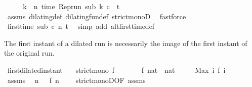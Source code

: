 \begin{isabellebody}
\ \isamarkupfalse%
\ {\isacharasterisk}\ \isamarkupfalse%
\ {\isacartoucheopen}{\isacharparenleft}{\isasymforall}k\ {\isacharless}\ n{\isachardot}\ time\ {\isacharparenleft}{\isacharparenleft}Rep{\isacharunderscore}run\ sub{\isacharparenright}\ k\ c{\isacharparenright}\ {\isacharless}\ t{\isacharparenright}{\isacartoucheclose}\isanewline
\ \ \ \ \isamarkupfalse%
\ assms\ dilating{\isacharunderscore}def\ dilating{\isacharunderscore}fun{\isacharunderscore}def\ strict{\isacharunderscore}monoD\ \isamarkupfalse%
\ fastforce\isanewline
\ \ \isamarkupfalse%
\ \isamarkupfalse%
\ {\isacartoucheopen}first{\isacharunderscore}time\ sub\ c\ n\ t{\isacartoucheclose}\ \isamarkupfalse%
\ {\isacharparenleft}simp\ add{\isacharcolon}\ alt{\isacharunderscore}first{\isacharunderscore}time{\isacharunderscore}def{\isacharparenright}\isanewline
{}\isamarkupfalse%
%
\endisatagproof
{\isafoldproof}%
%
\isadelimproof
%
\endisadelimproof
%
\begin{isamarkuptext}%
The first instant of a dilated run is necessarily the image of the first instant
  of the original run.%
\end{isamarkuptext}\isamarkuptrue%
\isamarkupfalse%
\ first{\isacharunderscore}dilated{\isacharunderscore}instant{\isacharcolon}\isanewline
\ \ \ {\isacartoucheopen}strict{\isacharunderscore}mono\ f{\isacartoucheclose}\isanewline
\ \ \ \ \ \ \ {\isacartoucheopen}f\ {\isacharparenleft}{}{\isacharcolon}{\isacharcolon}nat{\isacharparenright}\ {\isacharequal}\ {\isacharparenleft}{}{\isacharcolon}{\isacharcolon}nat{\isacharparenright}{\isacartoucheclose}\isanewline
\ \ \ \ \ {\isacartoucheopen}Max\ {\isacharbraceleft}i{\isachardot}\ f\ i\ {\isasymle}\ {}{\isacharbraceright}\ {\isacharequal}\ {}{\isacartoucheclose}\isanewline
%
\isadelimproof
%
\endisadelimproof
%
\isatagproof
{}\isamarkupfalse%
\ {\isacharminus}\isanewline
\ \ \isamarkupfalse%
\ assms{\isacharparenleft}{}{\isacharparenright}\ \isamarkupfalse%
\ {\isacartoucheopen}{\isasymforall}n\ {\isachargreater}\ {}{\isachardot}\ f\ n\ {\isachargreater}\ {}{\isacartoucheclose}\ \isamarkupfalse%
\ strict{\isacharunderscore}monoD{\isacharbrackleft}OF\ assms{\isacharparenleft}{}{\isacharparenright}{\isacharbrackright}\ \isamarkupfalse%

\end{isabellebody}
